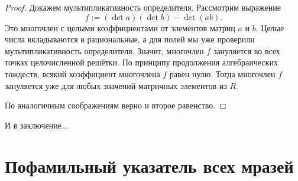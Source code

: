 \documentclass[a4paper,100pt]{article}
\theoremstyle{indented}
\theoremstyle{definition}
\theoremstyle{remark}
\begin{document}
\begin{proof}
    Докажем мультипликативность определителя. Рассмотрим выражение
    \[
        f:=(\det a)(\det b)-\det (ab).
    \]
    Это многочлен с целыми коэффициентами от элементов матриц $a$ и $b$. Целые числа вкладываются в рациональные, а для полей мы уже проверили мультипликативность определителя. Значит, многочлен $f$ зануляется во всех точках целочисленной решётки. По принципу продолжения алгебраических тождеств, всякий коэффициент многочлена $f$ равен нулю. Тогда многочлен $f$ зануляется уже для любых значений матричных элементов из $R$. \ 

    По аналогичным соображениям верно и второе равенство.
\end{proof}

\resetall



\newpage

\hypertarget{t2}{И в заключение...}



\section{Пофамильный указатель всех мразей}
\end{document}
